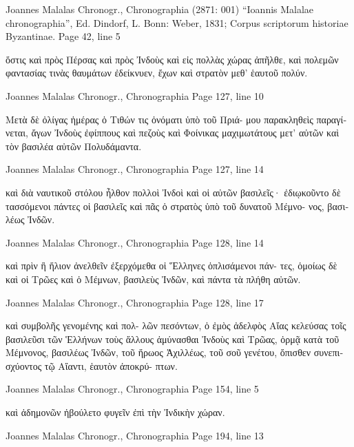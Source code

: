\documentclass[12pt,letterpaper,twoside,final]{memoir}
\begin{document}
\begin{greek}

Joannes Malalas Chronogr., Chronographia (2871: 001)
“Ioannis Malalae chronographia”, Ed. Dindorf, L.
Bonn: Weber, 1831; Corpus scriptorum historiae Byzantinae.
Page 42, line 5

                                                                  ὅστις 
καὶ πρὸς Πέρσας καὶ πρὸς Ἰνδοὺς καὶ εἰς πολλὰς χώρας ἀπῆλθε, 
καὶ πολεμῶν φαντασίας τινὰς θαυμάτων ἐδείκνυεν, ἔχων καὶ 
στρατὸν μεθ' ἑαυτοῦ πολύν. 



Joannes Malalas Chronogr., Chronographia 
Page 127, line 10

Μετὰ δὲ ὀλίγας ἡμέρας ὁ Τιθών τις ὀνόματι ὑπὸ τοῦ Πριά-
μου παρακληθεὶς παραγίνεται, ἄγων Ἰνδοὺς ἐφίππους καὶ πεζοὺς 
καὶ Φοίνικας μαχιμωτάτους μετ' αὐτῶν καὶ τὸν βασιλέα αὐτῶν 
Πολυδάμαντα. 



Joannes Malalas Chronogr., Chronographia 
Page 127, line 14

                                      καὶ διὰ ναυτικοῦ στόλου ἦλθον 
πολλοὶ Ἰνδοὶ καὶ οἱ αὐτῶν βασιλεῖς· ἐδιῳκοῦντο δὲ τασσόμενοι 
πάντες οἱ βασιλεῖς καὶ πᾶς ὁ στρατὸς ὑπὸ τοῦ δυνατοῦ Μέμνο-
νος, βασιλέως Ἰνδῶν. 



Joannes Malalas Chronogr., Chronographia 
Page 128, line 14

                                                                    καὶ 
πρὶν ἢ ἥλιον ἀνελθεῖν ἐξερχόμεθα οἱ Ἕλληνες ὁπλισάμενοι πάν-
τες, ὁμοίως δὲ καὶ οἱ Τρῶες καὶ ὁ Μέμνων, βασιλεὺς Ἰνδῶν, 
καὶ πάντα τὰ πλήθη αὐτῶν. 



Joannes Malalas Chronogr., Chronographia 
Page 128, line 17

                                καὶ συμβολῆς γενομένης καὶ πολ-
λῶν πεσόντων, ὁ ἐμὸς ἀδελφὸς Αἴας κελεύσας τοῖς βασιλεῦσι τῶν 
Ἑλλήνων τοὺς ἄλλους ἀμύνασθαι Ἰνδοὺς καὶ Τρῶας, ὁρμᾷ κατὰ 
τοῦ Μέμνονος, βασιλέως Ἰνδῶν, τοῦ ἥρωος Ἀχιλλέως, τοῦ σοῦ 
γενέτου, ὄπισθεν συνεπισχύοντος τῷ Αἴαντι, ἑαυτὸν ἀποκρύ-
πτων. 



Joannes Malalas Chronogr., Chronographia 
Page 154, line 5

                                                           καὶ 
ἀδημονῶν ἠβούλετο φυγεῖν ἐπὶ τὴν Ἰνδικὴν χώραν. 



Joannes Malalas Chronogr., Chronographia 
Page 194, line 13


\end{greek}
\end{document}
